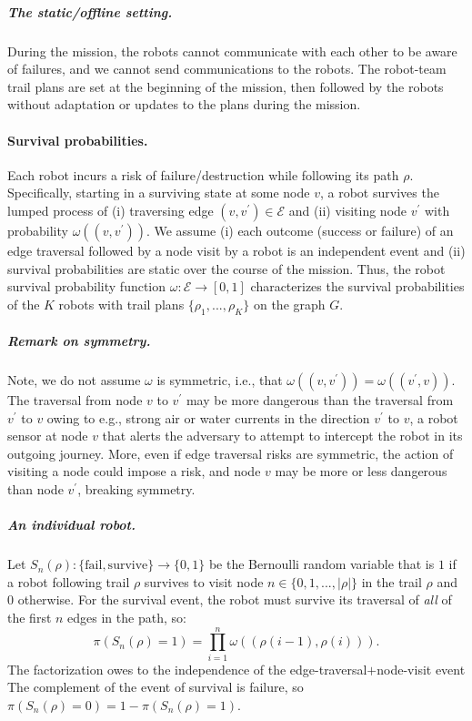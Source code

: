 \documentclass[11pt, oneside]{article}
\begin{document}
\subparagraph{The static/offline setting.} During the mission, the robots cannot communicate with each other to be aware of failures, and we cannot send communications to the robots. The robot-team trail plans are set at the beginning of the mission, then followed by the robots without adaptation or updates to the plans during the mission. 

\paragraph{Survival probabilities.}
Each robot incurs a risk of failure/destruction while following its path $\rho$. 
Specifically, starting in a surviving state at some node $v$, a robot survives the lumped process of (i) traversing edge $(v, v^\prime) \in \mathcal{E}$ and (ii) visiting node $v^\prime$ with probability $\omega((v, v^\prime))$. 
We assume (i) each outcome (success or failure) of an edge traversal followed by a node visit by a robot is an independent event and (ii) survival probabilities are static over the course of the mission. 
Thus, the robot survival probability function $\omega: \mathcal{E} \rightarrow [0, 1]$ characterizes the survival probabilities of the $K$ robots with trail plans $\{\rho_1, ..., \rho_K\}$ on the graph $G$.%

\subparagraph{Remark on symmetry.} Note, we do not assume $\omega$ is symmetric, i.e., that $\omega((v, v^\prime)) = \omega((v^\prime, v))$. The traversal from node $v$ to $v^\prime$ may be more dangerous than the traversal from $v^\prime$ to $v$ owing to e.g., strong air or water currents in the direction $v^\prime$ to $v$, a robot sensor at node $v$ that alerts the adversary to attempt to intercept the robot in its outgoing journey. More, even if edge traversal risks are symmetric, the action of visiting a node could impose a risk, and node $v$ may be more or less dangerous than node $v^\prime$, breaking symmetry. 

\subparagraph{An individual robot.}
Let $S_n(\rho) : \{\text{fail}, \text{survive}\} \rightarrow \{0, 1\} $ be the Bernoulli random variable that is $1$ if a robot following trail $\rho$ survives to visit node $n \in \{0, 1, ..., \lvert \rho \rvert\}$ in the trail $\rho$ and $0$ otherwise. For the survival event, the robot must survive its traversal of \emph{all} of the first $n$ edges in the path, so:
\begin{equation}
	\pi(S_n(\rho) = 1) = \prod_{i=1}^n \omega((\rho(i-1), \rho(i))).
\end{equation} The factorization owes to the independence of the edge-traversal$+$node-visit event
The complement of the event of survival is failure, so $\pi(S_n(\rho) = 0)=1-\pi(S_n(\rho) = 1)$.
\end{document}
